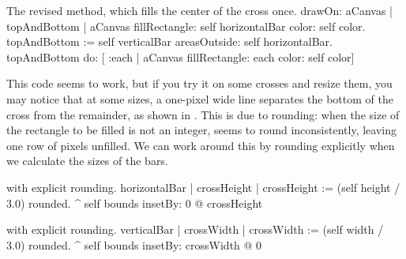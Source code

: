 \documentclass[a4paper,10pt,twoside]{book}
\begin{document}
\begin{method}{The revised  method, which fills the center of the cross once.}
drawOn: aCanvas 
	| topAndBottom |
	aCanvas fillRectangle: self horizontalBar color: self color.
	topAndBottom := self verticalBar areasOutside: self horizontalBar. 
	topAndBottom do: [ :each | aCanvas fillRectangle: each color: self color]
\end{method}

This code seems to work, but if you try it on some crosses and resize them, you may notice that at some sizes, a one-pixel wide line separates the bottom of the cross from the remainder, as shown in .
This is due to rounding: when the size of the rectangle to be filled is not an integer, 
seems to round inconsistently, leaving one row of pixels unfilled.
We can work around this by rounding explicitly when we calculate the sizes of the bars.

\begin{method}{ with explicit rounding.}
horizontalBar
	| crossHeight |
	crossHeight := (self height / 3.0) rounded.
	^ self bounds insetBy: 0 @ crossHeight
\end{method}

\begin{method}{ with explicit rounding.}
verticalBar
	| crossWidth |
	crossWidth := (self width / 3.0) rounded.
	^ self bounds insetBy: crossWidth @ 0
\end{method}






\end{document}
